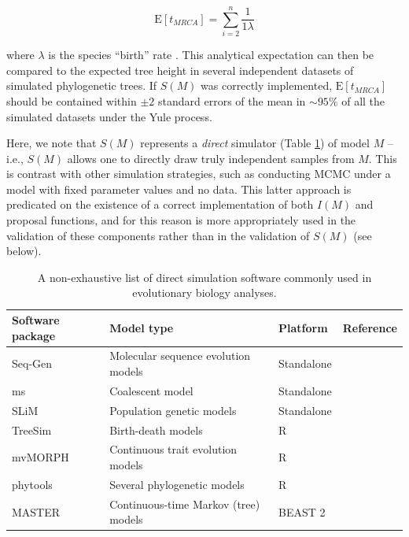 \documentclass[oneside]{article}
\begin{document}
\begin{equation}
  \text{E}[t_{MRCA}] = \sum_{i=2}^{n}\frac{1}{1\lambda}
  \label{eq:yule}
\end{equation}

\noindent where $\lambda$ is the species ``birth'' rate \citep{yule24}.
This analytical expectation can then be compared to the expected tree
height in several independent datasets of simulated phylogenetic trees.
If $S(M)$ was correctly implemented, $\text{E}[t_{MRCA}]$ should be contained within $\pm 2$ standard errors of
the mean in $\sim 95\%$ of all the simulated datasets under the Yule process.

Here, we note that $S(M)$ represents a \emph{direct} simulator (Table
\ref{tab:sim}) of model
$M$ -- i.e., $S(M)$ allows one to directly draw truly independent
samples from $M$.
This is contrast with other simulation strategies, such as conducting
MCMC under a model with fixed parameter values and no data.
This latter approach is predicated on the existence of a correct
implementation of both $I(M)$ and proposal functions, and for this
reason is more appropriately used in the validation of these components rather than in
the validation of $S(M)$ (see below).

\begin{center}
  \begin{table}
  \caption{A non-exhaustive list of direct simulation software commonly used in evolutionary
    biology analyses.}
  \label{tab:sim}
  \centering
  \begin{tabular}{ p{0.7in} | p{1.3in} | p{1in} | p{1.1in} }
    \hline
    Software package & Model type & Platform & Reference \\
    \hline  
    Seq-Gen & Molecular sequence evolution models & Standalone & \citealp{rambaut97} \\
    ms & Coalescent model & Standalone & \citealp{hudson02}\\
    SLiM & Population genetic models & Standalone & \citealp{haller19}\\
    TreeSim & Birth-death models & R & \citealp{stadler11}\\
    mvMORPH & Continuous trait evolution models & R &
                                                      \citealp{clavel15}\\
    phytools & Several phylogenetic models & R & \citealp{revell12}\\
    MASTER & Continuous-time Markov (tree) models & BEAST 2 & \citealp{vaughan13}\\
    \hline
  \end{tabular}
  \end{table}
\end{center}
\end{document}
